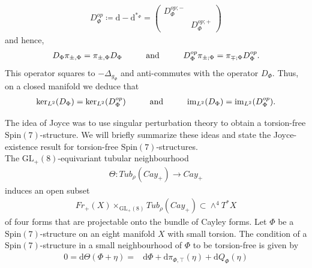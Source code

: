 \documentclass[psamsfonts]{amsart}
\theoremstyle{plain}
\theoremstyle{definition}{
\newtheorem{defi}{Definition}[section]
\newtheorem{ass}{Assumption}
\newtheorem*{nota}{Notation}}
\theoremstyle{remark}{
\newtheorem{rem}{Remark}
\newtheorem{ex}{Example}}
\theoremstyle{plain}{
\newtheorem{thm}{Theorem}[section]
\newtheorem{lem}{Lemma}[section]
\newtheorem{cor}{Corollary}[section]
\newtheorem{prop}{Proposition}[section]
\newtheorem{con}{Conjecture}[section]}
\newcommand{\m}[1]{{\mathrm{#1}}}
\newcommand{\und}[1]{\hspace{#1}\text{and}\hspace{#1}}
\begin{document}
\begin{align*}
    D_{\Phi}^{op}\coloneqq\m{d}-\m{d}^{*_{\Phi}}=\left(\begin{array}{cc}
         D^{op;-}_{\Phi}&\\
         & D^{op;+}_{\Phi}
    \end{array}\right)
\end{align*}
and hence,
\begin{align*}
    D_{\Phi}\pi_{\pm,\Phi}=\pi_{\pm,\Phi}D_{\Phi}\und{1.0cm}D_{\Phi}^{op}\pi_{\pm;\Phi}=\pi_{\mp;\Phi}D_{\Phi}^{op}.
\end{align*}
This operator squares to $-\Delta_{g_{\Phi}}$ and anti-commutes with the operator $D_{\Phi}$. Thus, on a closed manifold we deduce that 
\begin{align*}
    \m{ker}_{L^2}(D_{\Phi})=\m{ker}_{L^2}(D_{\Phi}^{op})\und{1.0cm}\m{im}_{L^2}(D_{\Phi})=\m{im}_{L^2}(D_{\Phi}^{op}).
\end{align*}

The idea of Joyce was to use singular perturbation theory to obtain a torsion-free $\m{Spin}(7)$-structure. We will briefly summarize these ideas and state the Joyce-existence result for torsion-free $\m{Spin}(7)$-structures.\\


The $\m{GL}_+(8)$-equivariant tubular neighbourhood 
\begin{align*}
    \Theta:Tub_\rho(Cay_+)\rightarrow Cay_+
\end{align*}
induces an open subset 
\begin{align*}
    Fr_+(X)\times_{\m{GL}_+(8)}Tub_\rho(Cay_+)\subset \wedge^4 T^*X
\end{align*}
of four forms that are projectable onto the bundle of Cayley forms. Let $\Phi$ be a $\m{Spin}(7)$-structure on an eight manifold $X$ with small torsion. The condition of a $\m{Spin}(7)$-structure in a small neighbourhood of ${\Phi}$ to be torsion-free is given by 
\begin{align*}
    0=\m{d}\Theta({\Phi}+\eta)=&\m{d}\Phi+\m{d}\pi_{\Phi,\top}(\eta)+\m{d}Q_{\Phi}(\eta)
\end{align*}
\end{document}
